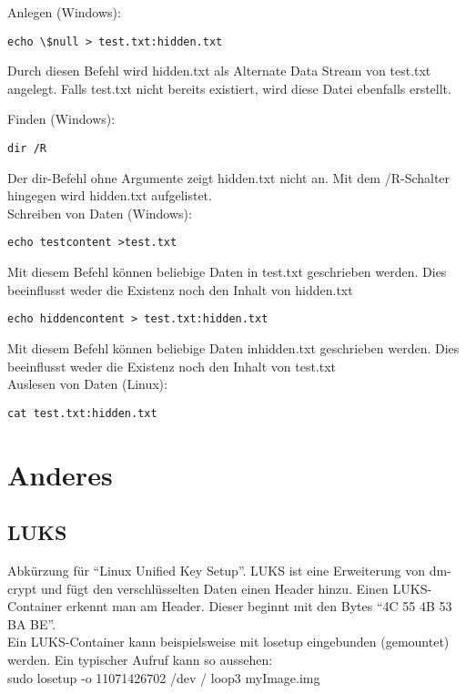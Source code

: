 Anlegen (Windows):\\

\begin{lstlisting}
echo \$null > test.txt:hidden.txt
\end{lstlisting}
Durch diesen Befehl wird hidden.txt als Alternate Data Stream von test.txt angelegt. Falls test.txt nicht bereits existiert, wird diese Datei ebenfalls erstellt.

Finden (Windows):\\

\begin{lstlisting}
dir /R
\end{lstlisting}
Der dir-Befehl ohne Argumente zeigt hidden.txt nicht an. Mit dem /R-Schalter hingegen wird hidden.txt aufgelistet.\\

Schreiben von Daten (Windows):\\

\begin{lstlisting}
echo testcontent >test.txt
\end{lstlisting}
Mit diesem Befehl können beliebige Daten in test.txt geschrieben werden. Dies beeinflusst weder die Existenz noch den Inhalt von hidden.txt\\

\begin{lstlisting}
echo hiddencontent > test.txt:hidden.txt
\end{lstlisting}
Mit diesem Befehl können beliebige Daten inhidden.txt geschrieben werden. Dies beeinflusst weder die Existenz noch den Inhalt von test.txt\\

Auslesen von Daten (Linux):\\
\begin{lstlisting}
cat test.txt:hidden.txt
\end{lstlisting}


\section{Anderes}
\subsection{LUKS}
Abkürzung für \enquote{Linux Unified Key Setup}. LUKS ist eine Erweiterung von dm-crypt und fügt den verschlüsselten Daten einen Header hinzu. Einen LUKS-Container erkennt man am Header. Dieser beginnt mit den Bytes \enquote{4C 55 4B 53 BA BE}.\\
Ein LUKS-Container kann beispielsweise mit losetup eingebunden (gemountet) werden. Ein typischer Aufruf kann so aussehen:\\
sudo losetup -o 11071426702 /dev / loop3 myImage.img\\
